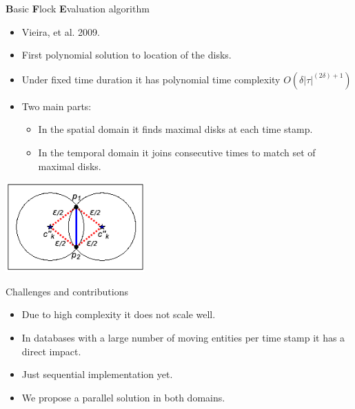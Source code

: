 \documentclass{beamer}
\begin{document}
    \begin{frame}{\textbf{B}asic \textbf{F}lock \textbf{E}valuation algorithm}
        \begin{itemize}
            \item Vieira, et al. 2009.
            \item First polynomial solution to location of the disks.
            \item Under fixed time duration it has polynomial time complexity $O(\delta|\tau|^{(2\delta) + 1})$
            \item Two main parts:
            \begin{itemize}
                \item In the spatial domain it finds maximal disks at each time stamp.
                \item In the temporal domain it joins consecutive times to match set of maximal disks.
            \end{itemize}
        \end{itemize}
        \vspace{0.25cm}

        \centering
        \includegraphics[width=0.4\textwidth]{figures/theorem}

    \end{frame}

    \begin{frame}{Challenges and contributions}
        \begin{itemize}
            \item Due to high complexity it does not scale well.
            \item In databases with a large number of moving entities per time stamp it has a direct impact.
            \item Just sequential implementation yet.
            \item We propose a parallel solution in both domains.
        \end{itemize}
    \end{frame}
\end{document}
